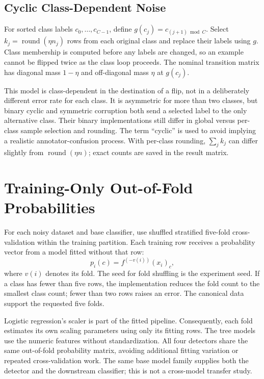 \subsection{Cyclic Class-Dependent Noise}
For sorted class labels $c_0,\ldots,c_{C-1}$, define
$g(c_j)=c_{(j+1)\bmod C}$. Select
$k_j=\operatorname{round}(\eta n_j)$ rows from each original class and replace
their labels using $g$. Class membership is computed before any labels are
changed, so an example cannot be flipped twice as the class loop proceeds.
The nominal transition matrix has diagonal mass $1-\eta$ and off-diagonal
mass $\eta$ at $g(c_j)$.

This model is class-dependent in the destination of a flip, not in a
deliberately different error rate for each class. It is asymmetric for more
than two classes, but binary cyclic and symmetric corruption both send a
selected label to the only alternative class. Their binary implementations
still differ in global versus per-class sample selection and rounding.
The term ``cyclic'' is used to avoid implying a realistic annotator-confusion
process. With per-class rounding, $\sum_j k_j$ can differ slightly from
$\operatorname{round}(\eta n)$; exact counts are saved in the result matrix.

\section{Training-Only Out-of-Fold Probabilities}
For each noisy dataset and base classifier, use shuffled stratified five-fold
cross-validation within the training partition. Each training row receives
a probability vector from a model fitted without that row:
\begin{equation}
 p_i(c)=f^{(-v(i))}(x_i)_c,
\end{equation}
where $v(i)$ denotes its fold. The seed for fold shuffling is the experiment
seed. If a class has fewer than five rows, the implementation reduces the
fold count to the smallest class count; fewer than two rows raises an error.
The canonical data support the requested five folds.

Logistic regression's scaler is part of the fitted pipeline. Consequently,
each fold estimates its own scaling parameters using only its fitting rows.
The tree models use the numeric features without standardization. All four
detectors share the same out-of-fold probability matrix, avoiding additional
fitting variation or repeated cross-validation work. The same base model
family supplies both the detector and the downstream classifier; this is not
a cross-model transfer study.

